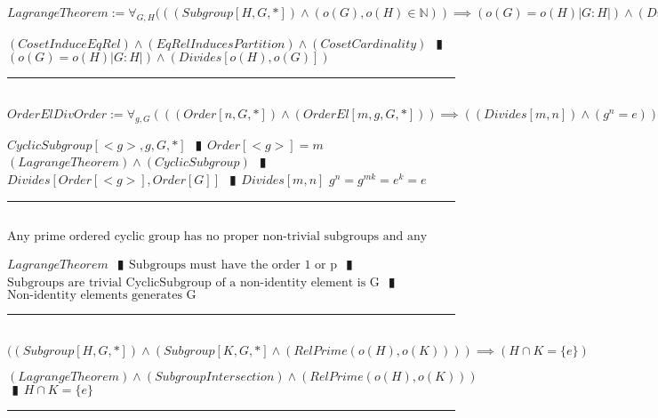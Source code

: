 \documentclass{book}
\newcommand{\abr}{:=}
\newcommand{\pipe}{$\phantom{(}\vrectangleblack\phantom{)}$}
\begin{document}
$LagrangeTheorem \abr \forall_{G, H}(((Subgroup[H, G, *]) \land (o(G), o(H) \in \mathbb{N})) \implies (o(G) = o(H) |G: H|) \land (Divides[o(H), o(G)])$
\begin{enumerate}
  \lit $(CosetInduceEqRel) \land (EqRelInducesPartition) \land (CosetCardinality)$ \pipe $(o(G) = o(H) |G: H|) \land (Divides[o(H), o(G)])$
\end{enumerate} \vspace{.75mm} \hrule \vspace{.75mm} \ \\

$OrderElDivOrder \abr \forall_{g, G}(((Order[n, G, *]) \land (OrderEl[m, g, G, *])) \implies ((Divides[m, n]) \land (g^n = e)))$
\begin{enumerate}
  \lit $CyclicSubgroup[<g>, g, G, *]$ \pipe $Order[<g>] = m$
  \lit $(LagrangeTheorem) \land (CyclicSubgroup)$ \pipe $Divides[Order[<g>], Order[G]]$ \pipe $Divides[m, n]$
  \lit $g^n = g^{m k} = e ^k = e$
\end{enumerate} \vspace{.75mm} \hrule \vspace{.75mm} \ \\

$\text{Any prime ordered cyclic group has no proper non-trivial subgroups and any non-identity element is a generator.}$
\begin{enumerate}
  \lit $LagrangeTheorem$ \pipe $\text{Subgroups must have the order 1 or p}$ \pipe $\text{Subgroups are trivial}$
  \lit $\text{CyclicSubgroup of a non-identity element is G}$ \pipe $\text{Non-identity elements generates G}$
\end{enumerate} \vspace{.75mm} \hrule \vspace{.75mm} \ \\

$((Subgroup[H, G, *]) \land (Subgroup[K, G, *] \land (RelPrime(o(H), o(K)))) \implies (H \cap K = \{e\})$
\begin{enumerate}
  \lit $(LagrangeTheorem) \land (SubgroupIntersection) \land (RelPrime(o(H), o(K)))$ \pipe $H \cap K = \{e\}$
\end{enumerate} \vspace{.75mm} \hrule \vspace{.75mm} \ \\
\end{document}
